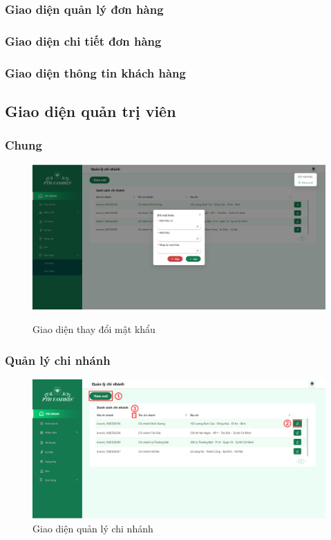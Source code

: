 \subsubsection{Giao diện quản lý đơn hàng}

\subsubsection{Giao diện chi tiết đơn hàng}

\subsubsection{Giao diện thông tin khách hàng}



\newpage
\subsection{Giao diện quản trị viên}
\subsubsection{Chung}
\begin{figure}[!htp]
    \centering
    \includegraphics[width=12cm]{img/UI/admin_implement/changePassword.png}
    \label{20}
    \newline
    \caption{Giao diện thay đổi mật khẩu}
\end{figure}


\subsubsection{Quản lý chi nhánh}
\begin{figure}[!htp]
    \centering
    \includegraphics[width=12cm]{img/UI/admin_implement/branch.png}
    \newline
    \caption{Giao diện quản lý chi nhánh}
\end{figure}

